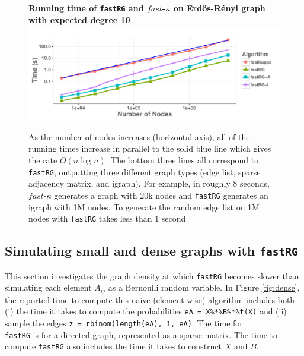 \documentclass[twoside,11pt]{article}
\begin{document}
\begin{figure}[htbp] %
   \centering
   \textbf{Running time of \texttt{fastRG} and $fast$-$\kappa$ on Erd\H{o}s-R\'enyi graph with expected degree 10}
   \includegraphics[width=6in]{compare.pdf} 
   \caption{As the  number of nodes increases (horizontal axis), all  of the running times increase in parallel to the solid blue line which gives the rate $O(n \log n)$.   The bottom three lines all correspond to \texttt{fastRG}, outputting three different graph types (edge list, sparse adjacency matrix, and igraph). For example,  in roughly  8 seconds, $fast$-$\kappa$ generates a graph with  20k nodes and \texttt{fastRG} generates an igraph with 1M nodes.  To  generate the random edge list on  1M nodes  with  \texttt{fastRG} takes less than 1 second}
   \label{fig:compare}
\end{figure}


\subsection{Simulating small and dense graphs with \texttt{fastRG}}

This section investigates the graph density at which \texttt{fastRG} becomes slower than simulating each element $A_{ij}$ as a Bernoulli random variable.  In Figure \ref{fig:dense}, the reported time to compute this naive (element-wise) algorithm includes both (i) the time it takes to compute the probabilities \texttt{eA = X\%*\%B\%*\%t(X)} and (ii) sample the edges \texttt{z = rbinom(length(eA), 1, eA)}.  The time for \\\texttt{fastRG} is for a directed graph, represented as a sparse matrix.  The time to compute \texttt{fastRG} also includes the time it takes to construct $X$ and $B$.   
\end{document}
